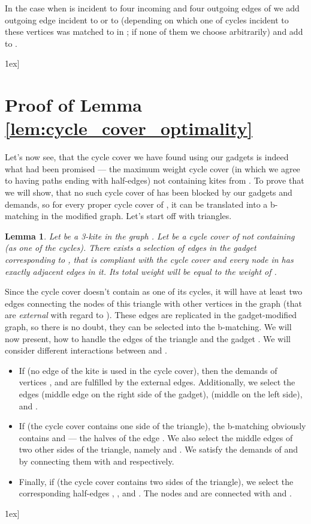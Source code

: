 \documentclass[a4, 11pt]{article}
\newcommand{\dowod}{\noindent{\bf Proof.~}}
\newcommand{\koniec}{\hfill \.1ex]}
\newcommand{\<}{\langle}
\renewcommand{\>}{\rangle}
\newtheorem{lemma}{Lemma}
\begin{document}
In the case when  is incident to four incoming and four outgoing edges of  we add outgoing edge incident to  or  to  (depending on which one of cycles incident to these vertices was matched to  in ; if none of them we choose arbitrarily) and add  to .

\koniec

\section{Proof of Lemma \ref{lem:cycle_cover_optimality}}
\label{sec:c2_opt_proof}

Let's now see, that the cycle cover we have found using our gadgets is indeed
  what had been promised --- the maximum weight cycle cover (in which we agree
  to having paths ending with half-edges) not containing kites from . To
  prove that we will show, that no such cycle cover of  has been blocked by
  our gadgets and demands, so for every proper cycle cover of , it can be
  translated into a b-matching in the modified graph. Let's start off with
  triangles.

  \begin{lemma}
    \label{lem:maxtsp_g2compute_trikite}
    Let  be a 3-kite in the graph . Let  be a cycle
    cover of  not containing  (as one of the cycles). There exists a selection
    of edges in the gadget  corresponding to , that is
    compliant with the cycle cover  and every node  in
     has exactly  adjacent edges in it. Its total weight
    will be equal to the weight of .
  \end{lemma}
  \dowod
    Since the cycle cover  doesn't contain  as one of its cycles, it will
    have at least two edges connecting the nodes of this triangle with other
    vertices in the graph (that are \emph{external} with regard to ). These
    edges are replicated in the gadget-modified graph, so there is no doubt,
    they can be selected into the b-matching. We will now present, how to handle
    the edges of the triangle  and the gadget . We will
    consider different interactions between  and .
\begin{itemize}
    \item If  (no edge of the kite is used
    in the cycle cover), then the demands of vertices ,  and  are
    fulfilled by the external edges. Additionally, we select the edges  (middle edge on the right side of the gadget),  (middle on the left side),  and
    .

    \item  If  (the cycle cover contains
    one side of the triangle), the b-matching obviously contains  and
     --- the halves of the edge . We also select the middle
    edges of two other sides of the triangle, namely  and
    . We satisfy the demands of  and  by connecting them with
     and  respectively.

    \item  Finally, if  (the cycle
    cover contains two sides of the triangle), we select the corresponding
    half-edges , ,  and . The nodes
     and  are connected with  and .
		
\end{itemize}		
  \koniec
\end{document}
